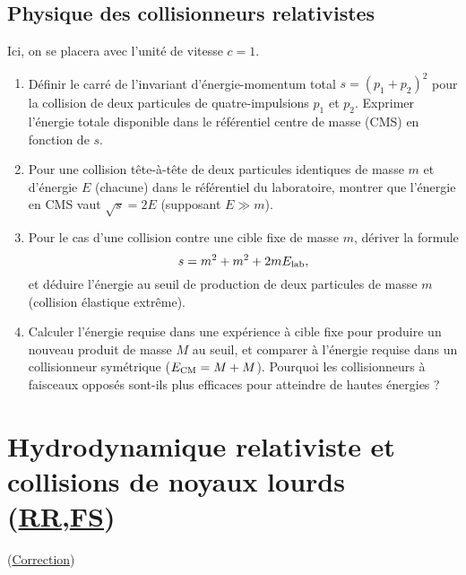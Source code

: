\documentclass[a4paper,10pt]{report}
\begin{document}
\subsection{Physique des collisionneurs relativistes}
Ici, on se placera avec l'unité de vitesse $c = 1$.
\begin{enumerate}
	\item Définir le carré de l'invariant d'énergie-momentum total $s=(p_1+p_2)^2$ pour la collision de deux particules de quatre-impulsions $p_1$ et $p_2$. Exprimer l'énergie totale disponible dans le référentiel centre de masse (CMS) en fonction de $s$.
	\item Pour une collision tête-à-tête de deux particules identiques de masse $m$ et d'énergie $E$ (chacune) dans le référentiel du laboratoire, montrer que l'énergie en CMS vaut $\sqrt{s}=2E$ (supposant $E\gg m$).
	\item Pour le cas d'une collision contre une cible fixe de masse $m$, dériver la formule 
	\[
	s = m^2 + m^2 + 2m E_{\rm lab},
	\]
	et déduire l'énergie au seuil de production de deux particules de masse $m$ (collision élastique extrême).
	\item Calculer l'énergie requise dans une expérience à cible fixe pour produire un nouveau produit de masse $M$ au seuil, et comparer à l'énergie requise dans un collisionneur symétrique ($E_{\rm CM}=M+M$). Pourquoi les collisionneurs à faisceaux opposés sont-ils plus efficaces pour atteindre de hautes énergies ?
\end{enumerate}

 
\newpage \section[Hydrodynamique relativiste et collisions de noyaux lourds $\triangle$]{Hydrodynamique relativiste et collisions de noyaux lourds (\hyperref[subsubsec:relativite]{RR},\hyperref[subsubsec:subatomique]{FS}) \\ \faStar\faStar\faStar\faStar\faStar}\label{subsec:Hyd}
(\hyperref[subsec:correctionHyd]{Correction})
\end{document}
